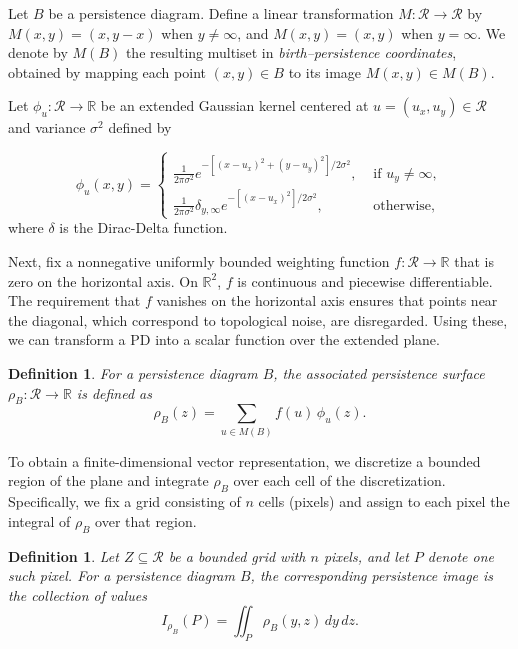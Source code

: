 \documentclass{article}
\newcommand{\R}{\mathbb{R}}
\newtheorem{definition}[theorem]{Definition}
\begin{document}
Let \( B \) be a persistence diagram. Define a linear transformation \( M : \mathcal{R} \to \mathcal{R} \) by \( M(x, y) = (x, y - x) \) when \( y \neq \infty \), and \( M(x, y) = (x, y) \) when \( y = \infty \). We denote by \( M(B) \) the resulting multiset in \emph{birth--persistence coordinates}, obtained by mapping each point \( (x, y) \in B \) to its image \( M(x,y) \in M(B) \).


Let $\phi_u:\mathcal{R} \to \R$ be an extended Gaussian kernel centered at $u = (u_x, u_y) \in \mathcal{R}$ and variance $\sigma^2$ defined by

\begin{equation} \label{eq: phi_u}
    \phi_u(x, y) = \begin{cases}
        \frac{1}{2\pi\sigma^2} e^{-[(x - u_x)^2 + (y - u_y)^2] / 2\sigma^2}, & \text{ if } u_y\neq \infty, \\
        \frac{1}{2\pi\sigma^2}\delta_{y, \infty}e^{-[(x - u_x)^2] / 2\sigma^2}, & \text{ otherwise},
    \end{cases}
\end{equation}
where $\delta$ is the Dirac-Delta function.

Next, fix a nonnegative uniformly bounded weighting function \( f : \mathcal R \to \R \) that is zero on the horizontal axis. On $\R^2$, $f$ is continuous and piecewise differentiable. The requirement that \( f \) vanishes on the horizontal axis ensures that points near the diagonal, which correspond to topological noise, are disregarded. Using these, we can transform a PD into a scalar function over the extended plane.

\begin{definition}\label{def:ps}
    For a persistence diagram \( B \), the associated \emph{persistence surface} \( \rho_B : \mathcal{R} \to \R \) is defined as
    \[
    \rho_B(z) = \sum_{u \in M(B)} f(u) \, \phi_u(z).
    \]
\end{definition}

To obtain a finite-dimensional vector representation, we discretize a bounded region of the plane and integrate \( \rho_B \) over each cell of the discretization. Specifically, we fix a grid consisting of \( n \) cells (pixels) and assign to each pixel the integral of \( \rho_B \) over that region.

\begin{definition}\label{def:pi}
    Let \( Z \subseteq \mathcal{R} \) be a bounded grid with \( n \) pixels, and let \( P \) denote one such pixel. For a persistence diagram \( B \), the corresponding \emph{persistence image} is the collection of values
    \[
    I_{\rho_B}(P) = \iint_P \rho_B(y, z) \, dy \, dz.
    \]
\end{definition}
\end{document}
